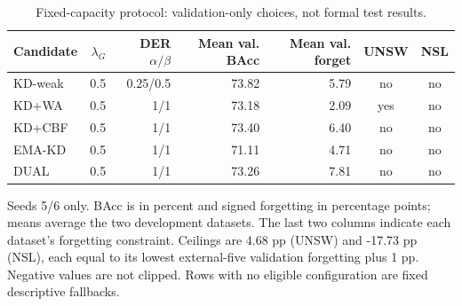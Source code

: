 \begin{table}[t]
\centering\scriptsize
\setlength{\tabcolsep}{3.8pt}
\caption{Fixed-capacity protocol: validation-only choices, not formal test results.}\label{tab:compact-selection}
\begin{tabular}{lrrrrcc}
\toprule
Candidate & $\lambda_G$ & DER $\alpha/\beta$ & Mean val. BAcc & Mean val. forget & UNSW & NSL \\
\midrule
KD-weak & 0.5 & 0.25/0.5 & 73.82 & 5.79 & no & no \\
KD+WA & 0.5 & 1/1 & 73.18 & 2.09 & yes & no \\
KD+CBF & 0.5 & 1/1 & 73.40 & 6.40 & no & no \\
EMA-KD & 0.5 & 1/1 & 71.11 & 4.71 & no & no \\
DUAL & 0.5 & 1/1 & 73.26 & 7.81 & no & no \\
\bottomrule
\end{tabular}
\par\vspace{2pt}\begin{minipage}{.98\linewidth}\footnotesize Seeds 5/6 only. BAcc is in percent and signed forgetting in percentage points; means average the two development datasets. The last two columns indicate each dataset's forgetting constraint. Ceilings are 4.68 pp (UNSW) and -17.73 pp (NSL), each equal to its lowest external-five validation forgetting plus 1 pp. Negative values are not clipped. Rows with no eligible configuration are fixed descriptive fallbacks.\end{minipage}
\end{table}
